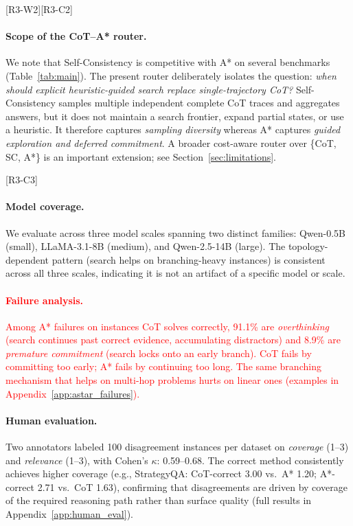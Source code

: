 \documentclass[11pt]{article}
\begin{document}
\textcolor{reviewerpurple}{[R3-W2][R3-C2] \paragraph{Scope of the CoT--A* router.} We note that Self-Consistency is competitive with A* on several benchmarks (Table~\ref{tab:main}). The present router deliberately isolates the question: \emph{when should explicit heuristic-guided search replace single-trajectory CoT?} Self-Consistency samples multiple independent complete CoT traces and aggregates answers, but it does not maintain a search frontier, expand partial states, or use a heuristic. It therefore captures \emph{sampling diversity} whereas A* captures \emph{guided exploration and deferred commitment}. A broader cost-aware router over \{CoT, SC, A*\} is an important extension; see Section~\ref{sec:limitations}.}

\textcolor{reviewerpurple}{[R3-C3] \paragraph{Model coverage.} We evaluate across three model scales spanning two distinct families: Qwen-0.5B (small), LLaMA-3.1-8B (medium), and Qwen-2.5-14B (large). The topology-dependent pattern (search helps on branching-heavy instances) is consistent across all three scales, indicating it is not an artifact of a specific model or scale.}

\textcolor{red}{\paragraph{Failure analysis.}
Among A* failures on instances CoT solves correctly, 91.1\% are \emph{overthinking} (search continues past correct evidence, accumulating distractors) and 8.9\% are \emph{premature commitment} (search locks onto an early branch). CoT fails by committing too early; A* fails by continuing too long. The same branching mechanism that helps on multi-hop problems hurts on linear ones (examples in Appendix~\ref{app:astar_failures}).}

\paragraph{Human evaluation.}
Two annotators labeled 100 disagreement instances per dataset on \emph{coverage} (1--3) and \emph{relevance} (1--3), with Cohen's $\kappa$: 0.59--0.68. The correct method consistently achieves higher coverage (e.g., StrategyQA: CoT-correct 3.00 vs.\ A* 1.20; A*-correct 2.71 vs.\ CoT 1.63), confirming that disagreements are driven by coverage of the required reasoning path rather than surface quality (full results in Appendix~\ref{app:human_eval}).
\end{document}
